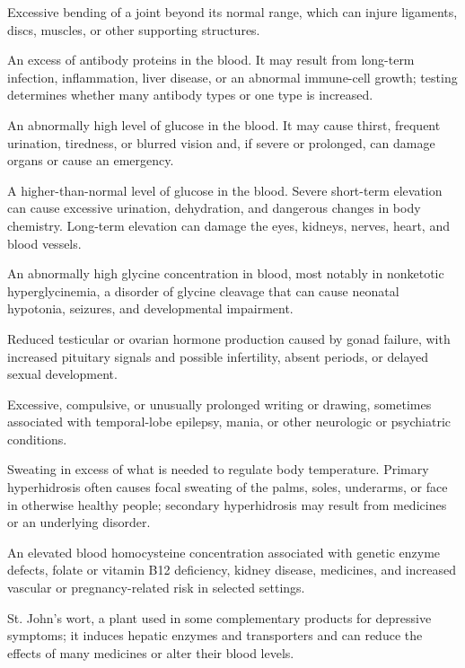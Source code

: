  Excessive bending of a joint beyond its normal range, which can injure ligaments, discs, muscles, or other supporting structures.

 An excess of antibody proteins in the blood. It may result from long-term infection, inflammation, liver disease, or an abnormal immune-cell growth; testing determines whether many antibody types or one type is increased.

 An abnormally high level of glucose in the blood. It may cause thirst, frequent urination, tiredness, or blurred vision and, if severe or prolonged, can damage organs or cause an emergency.

 A higher-than-normal level of glucose in the blood. Severe short-term elevation can cause excessive urination, dehydration, and dangerous changes in body chemistry. Long-term elevation can damage the eyes, kidneys, nerves, heart, and blood vessels.

 An abnormally high glycine concentration in blood, most notably in nonketotic hyperglycinemia, a disorder of glycine cleavage that can cause neonatal hypotonia, seizures, and developmental impairment.

 Reduced testicular or ovarian hormone production caused by gonad failure, with increased pituitary signals and possible infertility, absent periods, or delayed sexual development.

 Excessive, compulsive, or unusually prolonged writing or drawing, sometimes associated with temporal-lobe epilepsy, mania, or other neurologic or psychiatric conditions.

 Sweating in excess of what is needed to regulate body temperature. Primary hyperhidrosis often causes focal sweating of the palms, soles, underarms, or face in otherwise healthy people; secondary hyperhidrosis may result from medicines or an underlying disorder.

 An elevated blood homocysteine concentration associated with genetic enzyme defects, folate or vitamin B12 deficiency, kidney disease, medicines, and increased vascular or pregnancy-related risk in selected settings.

 St. John’s wort, a plant used in some complementary products for depressive symptoms; it induces hepatic enzymes and transporters and can reduce the effects of many medicines or alter their blood levels.

